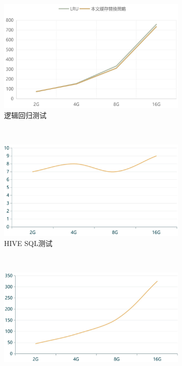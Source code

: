 \begin{figure}[!htbp]
    \centering
    \begin{subfigure}[b]{0.45\linewidth}
      \includegraphics[width=\textwidth]{Img/lr-cache.jpg}
      \caption{逻辑回归测试}
      \label{fig:lr-ac-2}
    \end{subfigure}%
    ~%
    \begin{subfigure}[b]{0.45\linewidth}
      \includegraphics[width=\textwidth]{Img/hive-ac-2.jpg}
      \caption{HIVE SQL测试}
      \label{fig:hive-ac-2}
    \end{subfigure}
    \\%
    \begin{subfigure}[b]{0.45\linewidth}
      \includegraphics[width=\textwidth]{Img/pagerank-ac-2.jpg}

\end{subfigure}
\end{figure}

